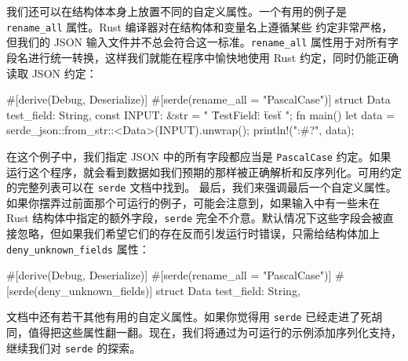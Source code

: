 我们还可以在结构体本身上放置不同的自定义属性。一个有用的例子是
\texttt{rename\_all} 属性。Rust 编译器对在结构体和变量名上遵循某些
约定非常严格，但我们的 JSON 输入文件并不总会符合这一标准。\texttt{rename\_all} 属性用于对所有字段名进行统一转换，这样我们就能在程序中愉快地使用 Rust 约定，同时仍能正确读取 JSON 约定：
\begin{codebox}[rust]
#[derive(Debug, Deserialize)]
#[serde(rename_all = "PascalCase")]
struct Data {
    test_field: String,
}
const INPUT: &str = "{ \"TestField\": \"test\" }";
fn main() {
    let data = serde_json::from_str::<Data>(INPUT).unwrap();
    println!("{:#?}", data);
}
\end{codebox}
在这个例子中，我们指定 JSON 中的所有字段都应当是 \texttt{PascalCase} 约定。如果运行这个程序，就会看到数据如我们预期的那样被正确解析和反序列化。可用约定的完整列表可以在 \texttt{serde} 文档中找到。
\label{idx:idx_8454cb16}
最后，我们来强调最后一个自定义属性。如果你摆弄过前面那个可运行的例子，可能会注意到，如果输入中有一些未在 Rust 结构体中指定的额外字段，\texttt{serde} 完全不介意。默认情况下这些字段会被直接忽略，但如果我们希望它们的存在反而引发运行时错误，只需给结构体加上 \texttt{deny\_\allowbreak{}unknown\_\allowbreak{}fields} 属性：
\begin{codebox}[rust]
#[derive(Debug, Deserialize)]
#[serde(rename_all = "PascalCase")]
#[serde(deny_unknown_fields)]
struct Data {
    test_field: String,
}
\end{codebox}
文档中还有若干其他有用的自定义属性。如果你觉得用 \texttt{serde} 已经走进了死胡同，值得把这些属性翻一翻。现在，我们将通过为可运行的示例添加序列化支持，继续我们对 \texttt{serde} 的探索。
